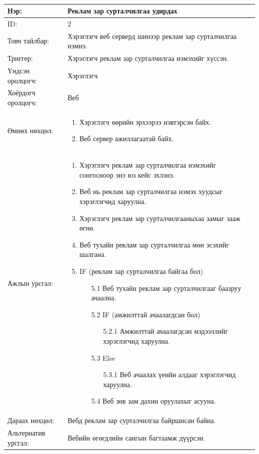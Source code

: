 \begin{center}
	\begin{table}[!htbp]
		\caption{}
		\begin{tabular}{|p{4cm}|p{11cm}|}
			\hline
			Нэр: & Реклам зар сурталчилгаа удирдах \\
			\hline
			ID: & 2 \\
			\hline
			Товч тайлбар: & Хэрэглэгч веб серверд шинээр реклам зар сурталчилгаа нэмнэ.  \\
			\hline
			Триггер: & Хэрэглэгч реклам зар сурталчилгаа нэмэхийг хүссэн. \\
			\hline
			Үндсэн оролцогч: & Хэрэглэгч \\
			\hline
			Хоёрдогч оролцогч: & Веб  \\
			\hline
			Өмнөх нөхцөл: &  \begin{enumerate}
								\item Хэрэглэгч өөрийн эрхээрээ нэвтэрсэн байх.
								\item Веб сервер ажиллагаатай байх.
							\end{enumerate}
\\			\hline
			Ажлын урсгал: & \begin{enumerate}
								\item Хэрэглэгч реклам зар сурталчилгаа нэмэхийг сонгосноор энэ юз кейс эхлэнэ.
								\item Веб нь реклам зар сурталчилгаа нэмэх хуудсыг хэрэглэгчид харуулна.
								\item Хэрэглэгч реклам зар сурталчилгааныхаа замыг зааж өгнө.
								\item Веб тухайн реклам зар сурталчилгаа мөн эсэхийг шалгана.
								\item IF (реклам зар сурталчилгаа байгаа бол)
									\begin{enumerate}
										\item[5.1] Веб тухайн реклам зар сурталчилгааг баазруу ачаална.
										\item[5.2] IF (амжилттай ачаалагдсан бол)
											\begin{enumerate}
												\item[5.2.1] Амжилттай ачаалагдсан мэдээллийг хэрэглэгчид харуулна.
											\end{enumerate}
										\item[5.3] Else
											\begin{enumerate}
												\item[5.3.1] Веб ачаалах үеийн алдааг хэрэглэгчид харуулна.
											\end{enumerate}
										\item[5.4] Веб зөв зам дахин оруулахыг асууна.
								\end{enumerate}
							\end{enumerate}
\\						\hline
			Дараах нөхцөл: &  Вебд реклам зар сурталчилгаа байршисан байна. \\
			\hline
			Альтернатив урсгал: &  Вебийн өгөгдлийн сангын багтаамж дүүрсэн. \\
			\hline
		\end{tabular}
	\end{table}
\end{center}

